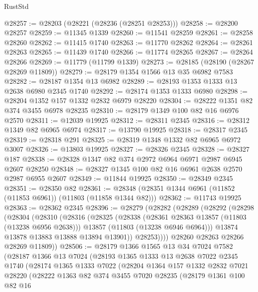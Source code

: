 \begin{lexlean}{RustStd}
\begin{coremodule}
@28257 := @28203 (@28221 (@28236 (@28251 @28253)))
@28258 := @28200 @28257
@28259 := @11345 @1339
@28260 := @11541 @28259
@28261 := @28258 @28260
@28262 := @11415 @1740
@28263 := @11770 @28262
@28264 := @28261 @28263
@28265 := @11439 @1740
@28266 := @11774 @28265
@28267 := @28264 @28266
@28269 := @11779 (@11799 @1339)
@28273 := @28185 (@28190 (@28267 @28269 @11809))
@28279 := @28179 @1354 @1566 @13 @35 @6982 @7583
@28282 := @28187 @1354 @13 @6982
@28289 := @28193 @1353 @1333 @13 @2638 @6980 @2345 @1740
@28292 := @28174 @1353 @1333 @6980
@28298 := @28204 @1352 @157 @1332 @2832 @6979 @28220
@28304 := @28222 @1351 @82 @374 @3455 @6978 @28235
@28310 := @28179 @1349 @100 @82 @16 @6976 @2570
@28311 := @12039 @19925
@28312 := @28311 @2345
@28316 := @28312 @1349 @82 @6965 @6974
@28317 := @13790 @19925
@28318 := @28317 @2345
@28319 := @28318 @291
@28325 := @28319 @1348 @1332 @82 @6965 @6972 @3007
@28326 := @13803 @19925
@28327 := @28326 @2345
@28328 := @28327 @187
@28338 := @28328 @1347 @82 @374 @2972 @6964 @6971 @2987 @6945 @2607 @28250
@28348 := @28327 @1345 @100 @82 @16 @6961 @2638 @2570 @2987 @6955 @2607
@28349 := @11844 @19925
@28350 := @28349 @2345
@28351 := @28350 @82
@28361 := @28348 (@28351 @1344 @6961 (@11852 (@11853 @6961)) (@11803 (@11858 @1344 @82)))
@28362 := @11743 @19925
@28363 := @28362 @2345
@28396 := @28279
    (@28282
      (@28289
        (@28292
          (@28298
            (@28304
              (@28310
                (@28316
                  (@28325
                    (@28338
                      (@28361 @28363 @13857 (@11803 (@13238 @6956 @2638)))
                      @13857
                      (@11803 (@13238 @6946 @6964)))
                    @13874
                    @13878
                    @13883
                    @13888
                    @13894
                    @13901))
                @28253))))
        @28260
        @28263
        @28266
        @28269
        @11809))
@28506 := @28179
    @1366
    @1565
    @13
    @34
    @7024
    @7582
    (@28187
      @1366
      @13
      @7024
      (@28193
        @1365
        @1333
        @13
        @2638
        @7022
        @2345
        @1740
        (@28174
          @1365
          @1333
          @7022
          (@28204
            @1364
            @157
            @1332
            @2832
            @7021
            @28220
            (@28222
              @1363
              @82
              @374
              @3455
              @7020
              @28235
              (@28179
                @1361
                @100
                @82
                @16

\end{coremodule}
\end{lexlean}
